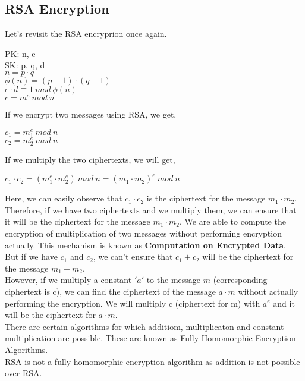 \documentclass[11pt]{article}
\begin{document}
\subsection{RSA Encryption}
Let's revisit the RSA encryprion once again.
\begin{center}
    PK: n, e\\
    SK: p, q, d\\
    $n = p \cdot q$\\
    $\phi(n) = (p-1) \cdot (q - 1)$\\
    $e \cdot d \equiv 1 \ mod \ \phi(n)$\\
    $c = m^e \ mod \ n$
\end{center}
If we encrypt two messages using RSA, we get,
\begin{center}
    $c_1 = m_1^e \ mod \ n$\\
    $c_2 = m_2^e \ mod \ n$
\end{center}
If we multiply the two ciphertexts, we will get,
\begin{center}
    $c_1 \cdot c_2 = (m_1^e \cdot m_2^e) \ mod \ n = {(m_1 \cdot m_2)}^e \ mod \ n$
\end{center}
Here, we can easily observe that $c_1 \cdot c_2$ is the ciphertext for the message $m_1 \cdot m_2$. Therefore, if we have two ciphertexts and we multiply them, we can ensure that it will be the ciphertext for the message $m_1 \cdot m_2$. We are able to compute the encryption of multiplication of two messages without performing encryption actually. This mechanism is known as \textbf{Computation on Encrypted Data}.\\
\newline
But if we have $c_1$ and $c_2$, we can't ensure that $c_1 + c_2$ will be the ciphertext for the message $m_1 + m_2$.\\
However, if we multiply a constant $'a'$ to the message $m$ (corresponding ciphertext is c), we can find the ciphertext of the message $a \cdot m$ without actually performing the encryption. We will multiply c (ciphertext for m) with $a^e$ and it will be the ciphertext for $a\cdot m$.\\
\newline
There are certain algorithms for which additiom, multiplicaton and constant multiplication are possible. These are known as Fully Homomorphic Encryption Algorithms. \\
RSA is not a fully homomorphic encryption algorithm as addition is not possible over RSA.\\
\newline
\end{document}
